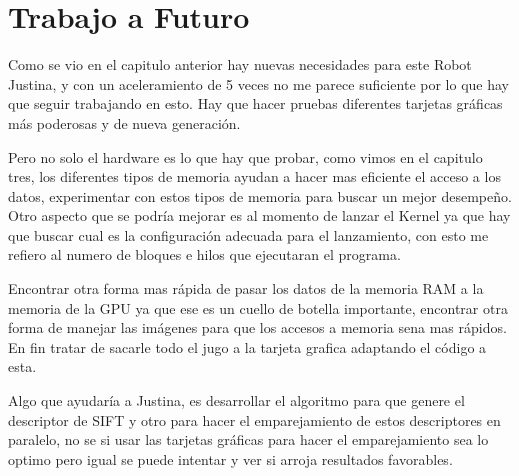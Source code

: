 \chapter{Trabajo a Futuro}

Como se vio en el capitulo anterior hay nuevas necesidades para este Robot Justina, y con un aceleramiento de 5 veces no me parece suficiente  por lo que hay que seguir trabajando en esto. Hay que hacer pruebas diferentes tarjetas gráficas más poderosas y de nueva generación.

Pero no solo el hardware es lo que hay que probar, como vimos en el capitulo tres, los diferentes tipos de memoria ayudan a hacer mas eficiente el acceso a los datos, experimentar con estos tipos de memoria para buscar un mejor desempeño. Otro aspecto que se podría mejorar es al momento de lanzar el Kernel ya que hay que buscar cual es la configuración adecuada para el lanzamiento, con esto me refiero al numero de bloques e hilos que ejecutaran el programa. 

Encontrar otra forma mas rápida de pasar los datos de la memoria RAM a la memoria de la GPU ya que ese es un cuello de botella importante, encontrar otra forma de manejar las imágenes para que los accesos a memoria sena mas rápidos. En fin tratar de sacarle todo el jugo a la tarjeta grafica adaptando el código a esta.  

Algo que ayudaría a Justina, es desarrollar el algoritmo para que genere el descriptor de SIFT y otro para hacer el emparejamiento de estos descriptores en paralelo, no se si usar las tarjetas gráficas para hacer el emparejamiento sea lo optimo pero igual se puede intentar y ver si arroja resultados favorables.  